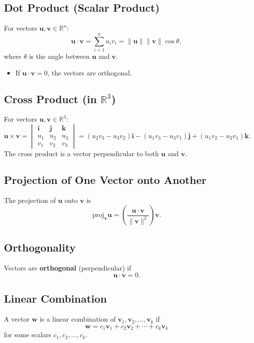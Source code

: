 \documentclass[a4paper,12pt]{article}
\begin{document}
\subsection{Dot Product (Scalar Product)}
For vectors $\mathbf{u}, \mathbf{v} \in \mathbb{R}^n$:
\[
\mathbf{u} \cdot \mathbf{v} = \sum_{i=1}^n u_i v_i = \|\mathbf{u}\| \|\mathbf{v}\| \cos\theta,
\]
where $\theta$ is the angle between $\mathbf{u}$ and $\mathbf{v}$.
\begin{itemize}
    \item If $\mathbf{u} \cdot \mathbf{v} = 0$, the vectors are orthogonal.
\end{itemize}

\subsection{Cross Product (in $\mathbb{R}^3$)}
For vectors $\mathbf{u}, \mathbf{v} \in \mathbb{R}^3$:
\[
\mathbf{u} \times \mathbf{v} = 
\begin{vmatrix}
\mathbf{i} & \mathbf{j} & \mathbf{k} \\
u_1 & u_2 & u_3 \\
v_1 & v_2 & v_3
\end{vmatrix}
= (u_2v_3 - u_3v_2)\mathbf{i} - (u_1v_3 - u_3v_1)\mathbf{j} + (u_1v_2 - u_2v_1)\mathbf{k}.
\]
The cross product is a vector perpendicular to both $\mathbf{u}$ and $\mathbf{v}$.

\subsection{Projection of One Vector onto Another}
The projection of $\mathbf{u}$ onto $\mathbf{v}$ is
\[
\text{proj}_{\mathbf{v}} \mathbf{u} = 
\left( \frac{\mathbf{u} \cdot \mathbf{v}}{\|\mathbf{v}\|^2} \right) \mathbf{v}.
\]

\subsection{Orthogonality}
Vectors are \textbf{orthogonal} (perpendicular) if
\[
\mathbf{u} \cdot \mathbf{v} = 0.
\]

\subsection{Linear Combination}
A vector $\mathbf{w}$ is a linear combination of $\mathbf{v}_1, \mathbf{v}_2, \dots, \mathbf{v}_k$ if
\[
\mathbf{w} = c_1 \mathbf{v}_1 + c_2 \mathbf{v}_2 + \cdots + c_k \mathbf{v}_k
\]
for some scalars $c_1, c_2, \dots, c_k$.
\end{document}
